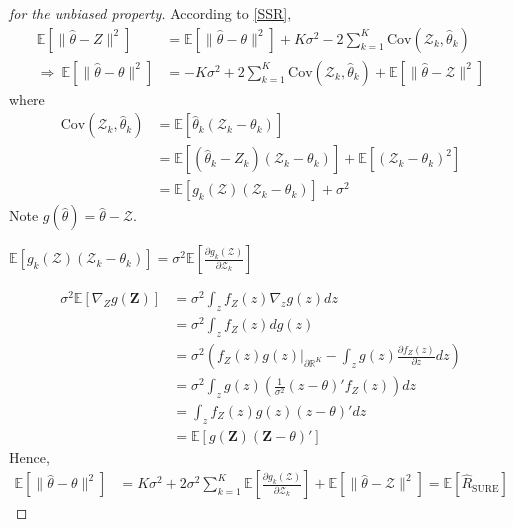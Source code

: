 \documentclass[11pt]{elegantbook}
\begin{document}
\begin{proof}[for the unbiased property]
    According to \eqref{SSR},
    \begin{equation}
        \begin{aligned}
            \mathbb{E}[\|\hat{\theta}-Z\|^2]&=\mathbb{E}[\|\hat{\theta}-\theta\|^2]+K\sigma^2-2\sum_{k=1}^K \text{Cov}(\mathcal{Z}_k,\hat{\theta}_k)\\
            \Rightarrow\ \mathbb{E}[\|\hat{\theta}-\theta\|^2]&=-K\sigma^2+2\sum_{k=1}^K \text{Cov}(\mathcal{Z}_k,\hat{\theta}_k)+\mathbb{E}[\|\hat{\theta}-\mathcal{Z}\|^2]
        \end{aligned}
        \nonumber
    \end{equation}
    where
    \begin{equation}
        \begin{aligned}
            \text{Cov}(\mathcal{Z}_k,\hat{\theta}_k)&=\mathbb{E}[\hat{\theta}_k(\mathcal{Z}_k-\theta_k)]\\
            &=\mathbb{E}[(\hat{\theta}_k-Z_k)(\mathcal{Z}_k-\theta_k)]+\mathbb{E}[(\mathcal{Z}_k-\theta_k)^2]\\
            &=\mathbb{E}[g_k(\mathcal{Z})(\mathcal{Z}_k-\theta_k)]+\sigma^2
        \end{aligned}
        \nonumber
    \end{equation}
    Note $g(\hat{\theta})=\hat{\theta}-\mathcal{Z}$.
    \begin{claim}
        $\mathbb{E}[g_k(\mathcal{Z})(\mathcal{Z}_k-\theta_k)]=\sigma^2 \mathbb{E}[\frac{\partial g_k(\mathcal{Z})}{\partial \mathcal{Z}_k}]$
    \end{claim}
    \begin{equation}
        \begin{aligned}
            \sigma^2\mathbb{E}[\nabla_Z g(\mathbf{Z})]&=\sigma^2\int_z f_Z(z)\nabla_z g(z) dz\\
            &=\sigma^2\int_z f_Z(z)d g(z)\\
            &=\sigma^2\left(f_Z(z)g(z)\bigg|_{\partial\mathbb{R}^K}-\int_z g(z)\frac{\partial  f_Z(z)}{\partial z}dz\right)\\
            &=\sigma^2\int_z g(z)\left(\frac{1}{\sigma^2}(z-\theta)'f_Z(z)\right)dz\\
            &=\int_z f_Z(z)g(z)(z-\theta)' dz\\
            &=\mathbb{E}[g(\mathbf{Z})(\mathbf{Z}-\theta)']
        \end{aligned}
        \nonumber
    \end{equation}
    Hence,
    \begin{equation}
        \begin{aligned}
            \mathbb{E}[\|\hat{\theta}-\theta\|^2]&=K\sigma^2+2\sigma^2\sum_{k=1}^K \mathbb{E}[\frac{\partial g_k(\mathcal{Z})}{\partial \mathcal{Z}_k}]+\mathbb{E}[\|\hat{\theta}-\mathcal{Z}\|^2]=\mathbb{E}[\hat{R}_\text{SURE}]
        \end{aligned}
        \nonumber
    \end{equation}
\end{proof}
\end{document}
